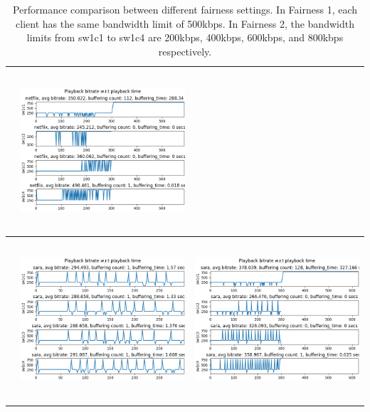 \documentclass[12pt]{article}
\begin{document}
\begin{table}[H]
\begin{tabular}{ | m{1em} | c | c |}
\begin{minipage}{.45\textwidth}
    \end{minipage}
    & 
    \begin{minipage}{.45\textwidth}
      \includegraphics[width=\linewidth, height=60mm]{images/results/fairness_2_netflix.png}
    \end{minipage}
    \\ \hline
    \parbox[t]{2mm}{}
    &
    \begin{minipage}{.45\textwidth}
      \includegraphics[width=\linewidth, height=60mm]{images/results/fairness_sara.png}
    \end{minipage}
    &
    \begin{minipage}{.45\textwidth}
      \includegraphics[width=\linewidth, height=60mm]{images/results/fairness_2_sara.png}
    \end{minipage}
    \\ \hline
  \end{tabular}
  \caption{Performance comparison between different fairness settings. In Fairness 1, each client has the same bandwidth limit of 500kbps. In Fairness 2, the bandwidth limits from sw1c1 to sw1c4 are 200kbps, 400kbps, 600kbps, and 800kbps respectively.}\label{tbl:fairness}
\end{table}
\end{document}
